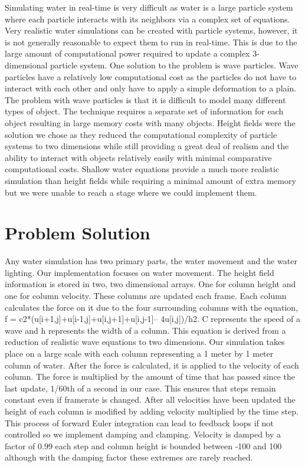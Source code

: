 \documentclass[12pt,titlepage]{article}
\begin{document}
Simulating water in real-time is very difficult as water is a large particle system where each particle interacts with its neighbors via a complex set of equations.  Very realistic water simulations can be created with particle systems, however, it is not generally reasonable to expect them to run in real-time.  This is due to the large amount of computational power required to update a complex 3-dimensional particle system.  One solution to the problem is wave particles.  Wave particles have a relatively low computational cost as the particles do not have to interact with each other and only have to apply a simple deformation to a plain.  The problem with wave particles is that it is difficult to model many different types of object.  The technique requires a separate set of information for each object resulting in large memory costs with many objects.  Height fields were the solution we chose as they reduced the computational complexity of particle systems to two dimensions while still providing a great deal of realism and the ability to interact with objects relatively easily with minimal comparative computational costs.  Shallow water equations provide a much more realistic simulation than height fields while requiring a minimal amount of extra memory but we were unable to reach a stage where we could implement them.
 
\section{Problem Solution}

Any water simulation has two primary parts, the water movement and the water 
lighting.  Our implementation focuses on water movement.  The height field 
information is stored in two, two dimensional arrays.  One for column height 
and one for column velocity.  These columns are updated each frame.  Each 
column calculates the force on it due to the four surrounding columns with the 
equation, f = c2*(u[i+1,j]+u[i-1,j]+u[i,j+1]+u[i,j-1]– 4u[i,j])/h2.  C 
represents the speed of a wave and h represents the width of a column.  This 
equation is derived from a reduction of realistic wave equations to two 
dimensions.  Our simulation takes place on a large scale with each column 
representing a 1 meter by 1 meter column of water.  After the force is 
calculated, it is applied to the velocity of each column.  The force is 
multiplied by the amount of time that has passed since the last update, 1/60th 
of a second in our case.  This ensures that steps remain constant even if 
framerate is changed.  After all velocities have been updated the height of 
each column is modified by adding velocity multiplied by the time step.  This 
process of forward Euler integration can lead to feedback loops if not 
controlled so we implement damping and clamping.  Velocity is damped by a 
factor of 0.99 each step and column height is bounded between -100 and 100 
although with the damping factor these extremes are rarely reached.
	
\end{document}
